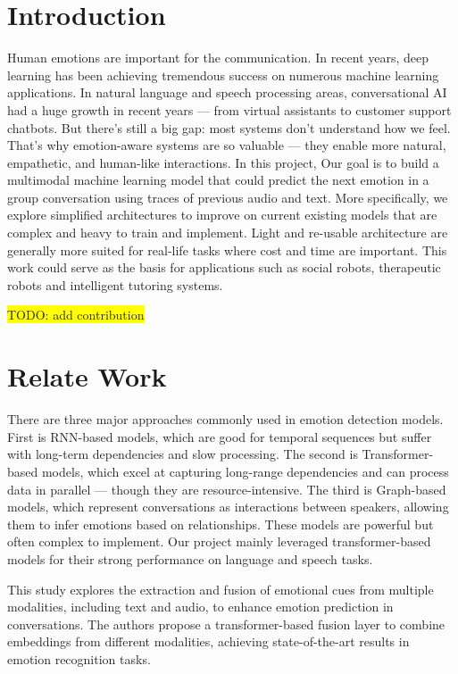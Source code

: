 \documentclass{article}
\begin{document}
\section{Introduction}
Human emotions are important for the  communication. In recent years, deep learning has been achieving tremendous success on numerous machine learning
applications. In natural language and speech processing areas, conversational AI had a huge growth in recent years — from virtual assistants to customer support chatbots. But there’s still a big gap: most systems don’t understand how we feel.
That’s why emotion-aware systems are so valuable — they enable more natural, empathetic, and human-like interactions. In this project, Our goal is to  build a multimodal machine learning model that could predict the next emotion in a group conversation using traces of previous audio and text. More specifically, we explore simplified architectures to improve on current existing models that are complex and heavy to train and implement. Light and re-usable architecture are generally more suited for real-life tasks where cost and time are important. This work could serve as the basis for applications such as social robots, therapeutic robots and intelligent tutoring systems. 

\colorbox{yellow}{TODO: add contribution}\\

\section{Relate Work}
There are three major approaches commonly used in emotion detection models.
First is RNN-based models, which are good for temporal sequences but suffer with long-term dependencies and slow processing. 
The second is Transformer-based models, which excel at capturing long-range dependencies and can process data in parallel — though they are resource-intensive.
The third is Graph-based models, which represent conversations as interactions between speakers, allowing them to infer emotions based on relationships. These models are powerful but often complex to implement.
Our project mainly leveraged transformer-based models for their strong performance on language and speech tasks.

 This study \cite{ERCFusionModel} explores the extraction and fusion of emotional cues from multiple modalities, including text and audio, to enhance emotion prediction in conversations. The authors propose a transformer-based fusion layer to combine embeddings from different modalities, achieving state-of-the-art results in emotion recognition tasks.
 
\end{document}
